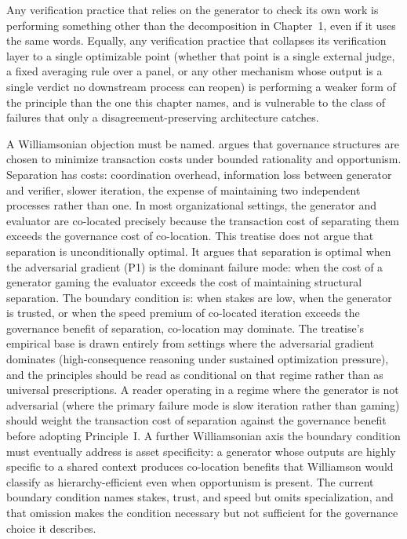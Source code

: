 \documentclass[11pt]{article}
\begin{document}
Any verification practice that relies on the generator to check its own work is performing something other than the decomposition in Chapter~1, even if it uses the same words. Equally, any verification practice that collapses its verification layer to a single optimizable point (whether that point is a single external judge, a fixed averaging rule over a panel, or any other mechanism whose output is a single verdict no downstream process can reopen) is performing a weaker form of the principle than the one this chapter names, and is vulnerable to the class of failures that only a disagreement-preserving architecture catches.

A Williamsonian objection must be named. \citet{williamson1975} argues that governance structures are chosen to minimize transaction costs under bounded rationality and opportunism. Separation has costs: coordination overhead, information loss between generator and verifier, slower iteration, the expense of maintaining two independent processes rather than one. In most organizational settings, the generator and evaluator are co-located precisely because the transaction cost of separating them exceeds the governance cost of co-location. This treatise does not argue that separation is unconditionally optimal. It argues that separation is optimal when the adversarial gradient (P1) is the dominant failure mode: when the cost of a generator gaming the evaluator exceeds the cost of maintaining structural separation. The boundary condition is: when stakes are low, when the generator is trusted, or when the speed premium of co-located iteration exceeds the governance benefit of separation, co-location may dominate. The treatise's empirical base is drawn entirely from settings where the adversarial gradient dominates (high-consequence reasoning under sustained optimization pressure), and the principles should be read as conditional on that regime rather than as universal prescriptions. A reader operating in a regime where the generator is not adversarial (where the primary failure mode is slow iteration rather than gaming) should weight the transaction cost of separation against the governance benefit before adopting Principle~I. A further Williamsonian axis the boundary condition must eventually address is asset specificity: a generator whose outputs are highly specific to a shared context produces co-location benefits that Williamson would classify as hierarchy-efficient even when opportunism is present. The current boundary condition names stakes, trust, and speed but omits specialization, and that omission makes the condition necessary but not sufficient for the governance choice it describes.
\end{document}
